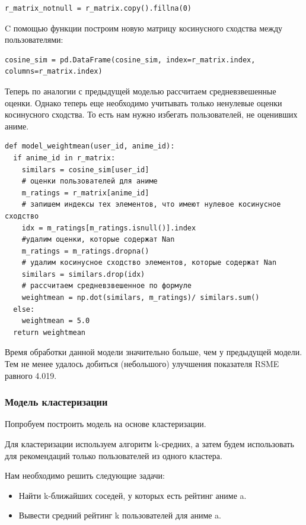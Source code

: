 \documentclass[bachelor, och, diploma]{SCWorks}
\begin{document}
\begin{verbatim}
r_matrix_notnull = r_matrix.copy().fillna(0)
\end{verbatim}

C помощью функции построим новую матрицу косинусного сходства между пользователями:

\begin{verbatim}
cosine_sim = pd.DataFrame(cosine_sim, index=r_matrix.index, columns=r_matrix.index)
\end{verbatim}

Теперь по аналогии с предыдущей моделью рассчитаем средневзвешенные оценки. Однако теперь еще необходимо учитывать только ненулевые оценки косинусного сходства. 
То есть нам нужно избегать пользователей, не оценивших аниме.

\begin{verbatim}
def model_weightmean(user_id, anime_id):
  if anime_id in r_matrix:
    similars = cosine_sim[user_id]
    # оценки пользователей для аниме
    m_ratings = r_matrix[anime_id]
    # запишем индексы тех элементов, что имеют нулевое косинусное сходство
    idx = m_ratings[m_ratings.isnull()].index
    #удалим оценки, которые содержат Nan
    m_ratings = m_ratings.dropna()
    # удалим косинусное сходство элементов, которые содержат Nan
    similars = similars.drop(idx)
    # рассчитаем средневзвешенное по формуле
    weightmean = np.dot(similars, m_ratings)/ similars.sum()
  else:
    weightmean = 5.0
  return weightmean
\end{verbatim}

Время обработки данной модели значительно больше, чем у предыдущей модели. Тем не менее удалось добиться (небольшого) улучшения показателя RSME равного 4.019.

\subsubsection{Модель кластеризации}

Попробуем построить модель на основе кластеризации.

Для кластеризации используем алгоритм k-средних, а затем будем использовать для рекомендаций только пользователей из одного кластера.

Нам необходимо решить следующие задачи:
\begin{itemize}
	\item Найти k-ближайших соседей, у которых есть рейтинг аниме a.
	\item Вывести средний рейтинг k пользователей для аниме a.
\end{itemize}
\end{document}
